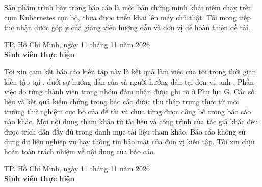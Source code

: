 Sản phẩm trình bày trong báo cáo là một bản chứng minh khái niệm chạy trên cụm Kubernetes cục bộ, chưa được triển khai lên máy chủ thật. Tôi mong tiếp tục nhận được góp ý của giảng viên hướng dẫn và đơn vị để hoàn thiện đề tài.

\vspace{12pt}
\hfill\begin{minipage}{10cm}\centering
TP. Hồ Chí Minh, ngày 11 tháng 11 năm 2026\\
\textbf{Sinh viên thực hiện}\\[4pt]
\svth
\end{minipage}

Tôi xin cam kết báo cáo kiến tập này là kết quả làm việc của tôi trong thời gian kiến tập tại \coquan, dưới sự hướng dẫn của \gvhd{} và người hướng dẫn tại đơn vị, anh \mentor. Phần việc do từng thành viên trong nhóm đảm nhận được ghi rõ ở Phụ lục G. Các số liệu và kết quả kiểm chứng trong báo cáo được thu thập trung thực từ môi trường thử nghiệm cục bộ của đề tài và chưa từng được công bố trong báo cáo nào khác. Mọi nội dung tham khảo từ tài liệu và công trình của tác giả khác đều được trích dẫn đầy đủ trong danh mục tài liệu tham khảo. Báo cáo không sử dụng dữ liệu nghiệp vụ hay thông tin bảo mật của đơn vị kiến tập. Tôi xin chịu hoàn toàn trách nhiệm về nội dung của báo cáo.

\vspace{12pt}
\hfill\begin{minipage}{10cm}\centering
TP. Hồ Chí Minh, ngày 11 tháng 11 năm 2026\\
\textbf{Sinh viên thực hiện}\\[4pt]
\svth
\end{minipage}

\clearpage
